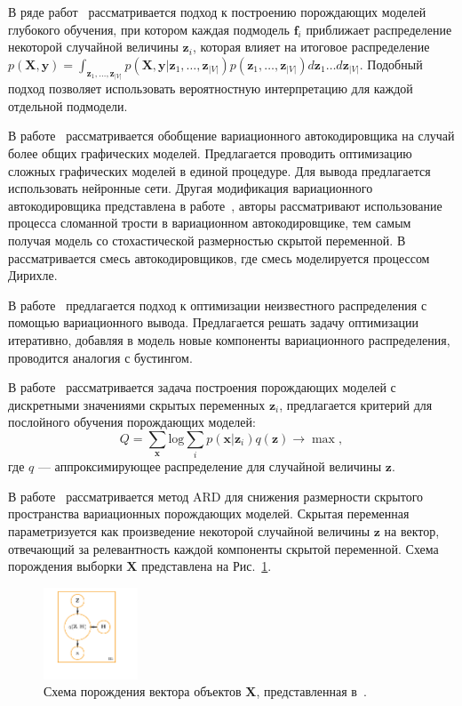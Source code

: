 В ряде работ~\cite{vae_graph,vae_stick,vae_mix,var_boost,layerwise_optimal} рассматривается подход к построению порождающих моделей глубокого обучения, при котором каждая подмодель $\mathbf{f}_i$ приближает распределение некоторой случайной величины $\mathbf{z}_i$, которая влияет на итоговое распределение $p(\mathbf{X}, \mathbf{y}) = \int_{\mathbf{z}_1, \dots, \mathbf{z}_{|V|}} p(\mathbf{X}, \mathbf{y}|\mathbf{z}_1, \dots, \mathbf{z}_{|V|})p(\mathbf{z}_1, \dots, \mathbf{z}_{|V|})d\mathbf{z}_1\dots d\mathbf{z}_{|V|}.$ Подобный подход позволяет использовать вероятностную интерпретацию для каждой отдельной подмодели. 

В работе~\cite{vae_graph} рассматривается обобщение вариационного автокодировщика на случай более общих графических моделей. Предлагается проводить оптимизацию сложных графических моделей в единой процедуре. Для вывода предлагается использовать нейронные сети.
Другая модификация вариационного автокодировщика представлена в работе~\cite{vae_stick}, авторы рассматривают использование процесса сломанной трости в вариационном автокодировщике, тем самым получая модель со стохастической размерностью скрытой переменной. В~\cite{vae_mix} рассматривается смесь автокодировщиков, где смесь моделируется процессом Дирихле.

В работе~\cite{var_boost} предлагается подход к оптимизации неизвестного распределения с помощью вариационного вывода. Предлагается решать задачу оптимизации итеративно, добавляя в модель новые компоненты вариационного распределения, проводится аналогия с бустингом.

В работе~\cite{layerwise_optimal} рассматривается задача построения порождающих моделей с дискретными значениями скрытых переменных $\mathbf{z}_i$, предлагается критерий для послойного обучения порождающих моделей:
\[
    Q = \sum_{\mathbf{x}} \text{log} \sum_{i}p(\mathbf{x}|\mathbf{z}_i)q(\mathbf{z}) \to \max,
\]
где $q$ --- аппроксимирующее распределение для случайной величины $\mathbf{z}$. 

В работе~\cite{vae_ard} рассматривается метод ARD для снижения размерности скрытого пространства вариационных порождающих моделей. Скрытая переменная параметризуется как  произведение некоторой случайной величины $\mathbf{z}$  на вектор, отвечающий за релевантность каждой компоненты скрытой переменной. Схема порождения выборки $\mathbf{X}$ представлена на Рис.~\ref{fig:vae_ard}.

\begin{figure}[H]
\centering
\includegraphics[width=0.25\textwidth]{./plots/notebooks/ae_plate.pdf}
\caption{Схема порождения вектора объектов $\mathbf{X}$, представленная в~\cite{vae_ard}.}
\label{fig:vae_ard}

\end{figure}

